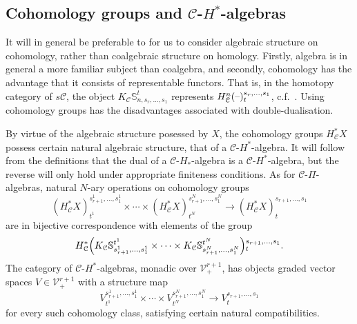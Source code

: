 \documentclass[11pt]{amsart}
\theoremstyle{plain}
\theoremstyle{definition}
\newcommand{\DASH}{\textup{--}}
\renewcommand{\to}{\longrightarrow}
\newcommand{\calC}{\mathcal{C}}
\newcommand{\calV}{\mathcal{V}}
\newcommand{\calc}{\mathcal{C}}
\theoremstyle{plain}
\newcommand{\vect}[2]{\calV^{#1}_{#2}}
\begin{document}
\begin{CPiAlgs and CHalgs}
\subsection{Cohomology groups and $\calC$-$H^*$-algebras}\label{cohomology and Halgs}
It will in general be preferable to for us to consider algebraic structure on cohomology, rather than coalgebraic structure on homology. Firstly, algebra is in general a more familiar subject than coalgebra, and secondly, cohomology has the advantage that it consists of representable functors. That is, in the homotopy category of $s\calc$, the object $K_\calC\mathbb{S}^t_{n,s_r,\ldots,s_1}$ represents $H^n_{\calc}(\DASH)_t^{s_r,\ldots,s_1}$,  c.f.\ \cite[Proposition 4.3]{MR1089001}. Using cohomology groups has the disadvantages associated with double-dualisation.




By virtue of the algebraic structure posessed by $X$, the cohomology groups $H_\calc^*X$ possess certain natural algebraic structure, that of a $\calc$-$H^*$-algebra. It will follow from the definitions that the dual of a $\calc$-$H_*$-algebra is a $\calc$-$H^*$-algebra, but the reverse will only hold under appropriate finiteness conditions. As for $\calc$-$\Pi$-algebras, natural $N$-ary operations on cohomology groups
\[(H^*_\calc X)^{s_{r+1}^{1},\ldots,s_{1}^{1}}_{t^1}\times\cdots \times(H^*_\calc X)^{s_{r+1}^{N},\ldots,s_{1}^{N}}_{t^N}\to (H^*_\calc X)^{s_{r+1},\ldots,s_{1}}_{t}\]
are in bijective correspondence with elements of the group
\[ H^*_\calc\Bigl(K_\calC\mathbb{S}_{s_{r+1}^{1},\ldots,s_{1}^{1}}^{t^1}\times\cdots\times K_\calC\mathbb{S}_{s_{r+1}^{N},\ldots,s_{1}^{N}}^{t^N}\Bigr)\makebox[0cm][l]{}^{s_{r+1},\ldots,s_{1}}_{t}.\]
The category of $\calC$-$H^*$-algebras, monadic over $\vect{r+1}{+}$, has objects graded vector spaces $V\in\vect{r+1}{+}$ with a structure map 
\[V^{s_{r+1}^{1},\ldots,s_{1}^{1}}_{t^1}\times\cdots \times V^{s_{r+1}^{N},\ldots,s_{1}^{N}}_{t^N}\to V^{s_{r+1},\ldots,s_{1}}_{t}\]
for every such cohomology class, satisfying certain natural compatibilities.


\end{CPiAlgs and CHalgs}
\end{document}
